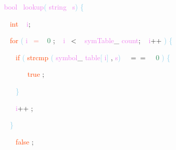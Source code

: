 \documentclass[8, usernames, dvipsnames]{beamer}
\begin{document}
\begin{frame}

 \textcolor{Violet}{bool}\textcolor{White}{\ }
\textcolor{Violet}{lookup}\textcolor{SkyBlue}{(}
\textcolor{Violet}{string}\textcolor{White}{\ }
\textcolor{Violet}{s}\textcolor{SkyBlue}{)}
\textcolor{SkyBlue}{\{ }

 \textcolor{White}{\   }
\textcolor{OrangeRed}{int}
\textcolor{White}{\ }
\textcolor{Violet}{i}\textcolor{Sepia}{;}

 \textcolor{White}{\   }
\textcolor{OrangeRed}{for}
\textcolor{SkyBlue}{(}
\textcolor{Violet}{i}\textcolor{White}{\ }
\textcolor{Salmon}{=}
\textcolor{White}{\ }
\textcolor{SeaGreen}{0}
\textcolor{Sepia}{;}
\textcolor{White}{\ }
\textcolor{Violet}{i}\textcolor{White}{\ }
\textcolor{OliveGreen}{\textless}
\textcolor{White}{\ }
\textcolor{Violet}{symTable}\textcolor{Sepia}{\_}
\textcolor{Violet}{count}\textcolor{Sepia}{;}
\textcolor{White}{\ }
\textcolor{Violet}{i}\textcolor{Apricot}{++}
\textcolor{SkyBlue}{)}
\textcolor{SkyBlue}{\{ }

 \textcolor{White}{\   }
\textcolor{White}{\   }
\textcolor{OrangeRed}{if}
\textcolor{SkyBlue}{(}
\textcolor{OrangeRed}{strcmp}
\textcolor{SkyBlue}{(}
\textcolor{Violet}{symbol}\textcolor{Sepia}{\_}
\textcolor{Violet}{table}\textcolor{SkyBlue}{[}
\textcolor{Violet}{i}\textcolor{SkyBlue}{]}
\textcolor{Sepia}{,}
\textcolor{Violet}{s}\textcolor{SkyBlue}{)}
\textcolor{White}{\ }
\textcolor{OliveGreen}{$==$}
\textcolor{White}{\ }
\textcolor{SeaGreen}{0}
\textcolor{SkyBlue}{)}
\textcolor{SkyBlue}{\{ }

 \textcolor{White}{\   }
\textcolor{White}{\   }
\textcolor{White}{\   }
\textcolor{OrangeRed}{	}
\textcolor{White}{\ }
\textcolor{OrangeRed}{true}
\textcolor{Sepia}{;}

 \textcolor{White}{\   }
\textcolor{White}{\   }
\textcolor{SkyBlue}{\} }

 \textcolor{White}{\   }
\textcolor{White}{\   }
\textcolor{Violet}{i}\textcolor{Apricot}{++}
\textcolor{Sepia}{;}

 \textcolor{White}{\   }
\textcolor{SkyBlue}{\} }

 \textcolor{White}{\   }
\textcolor{OrangeRed}{	}
\textcolor{White}{\ }
\textcolor{OrangeRed}{false}
\textcolor{Sepia}{;}

 \end{frame}
\end{document}
